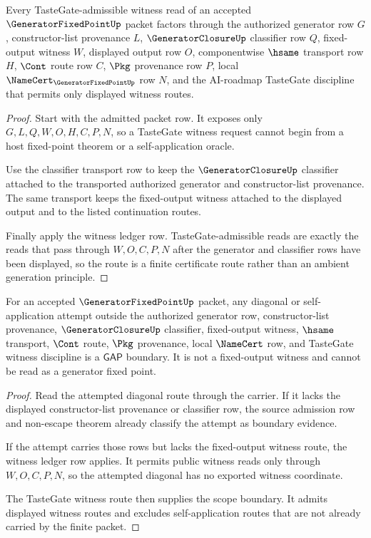 \begin{theorem}
\label{thm:generator-fixed-point-tastegate-witness-route}
Every TasteGate-admissible witness read of an accepted $\GeneratorFixedPointUp$ packet factors through the authorized generator row $G$, constructor-list provenance $L$, $\GeneratorClosureUp$ classifier row $Q$, fixed-output witness $W$, displayed output row $O$, componentwise $\hsame$ transport row $H$, $\Cont$ route row $C$, $\Pkg$ provenance row $P$, local $\NameCert_{\GeneratorFixedPointUp}$ row $N$, and the AI-roadmap TasteGate discipline that permits only displayed witness routes.
\end{theorem}
\begin{proof}
Start with the admitted packet row. It exposes only $G,L,Q,W,O,H,C,P,N$, so a TasteGate witness request cannot begin from a host fixed-point theorem or a self-application oracle.

Use the classifier transport row to keep the $\GeneratorClosureUp$ classifier attached to the transported authorized generator and constructor-list provenance. The same transport keeps the fixed-output witness attached to the displayed output and to the listed continuation routes.

Finally apply the witness ledger row. TasteGate-admissible reads are exactly the reads that pass through $W,O,C,P,N$ after the generator and classifier rows have been displayed, so the route is a finite certificate route rather than an ambient generation principle.
\end{proof}

\begin{theorem}
\label{thm:generator-fixed-point-diagonal-obstruction-scope}
For an accepted $\GeneratorFixedPointUp$ packet, any diagonal or self-application attempt outside the authorized generator row, constructor-list provenance, $\GeneratorClosureUp$ classifier, fixed-output witness, $\hsame$ transport, $\Cont$ route, $\Pkg$ provenance, local $\NameCert$ row, and TasteGate witness discipline is a $\mathsf{GAP}$ boundary. It is not a fixed-output witness and cannot be read as a generator fixed point.
\end{theorem}
\begin{proof}
Read the attempted diagonal route through the carrier. If it lacks the displayed constructor-list provenance or classifier row, the source admission row and non-escape theorem already classify the attempt as boundary evidence.

If the attempt carries those rows but lacks the fixed-output witness route, the witness ledger row applies. It permits public witness reads only through $W,O,C,P,N$, so the attempted diagonal has no exported witness coordinate.

The TasteGate witness route then supplies the scope boundary. It admits displayed witness routes and excludes self-application routes that are not already carried by the finite packet.
\end{proof}

